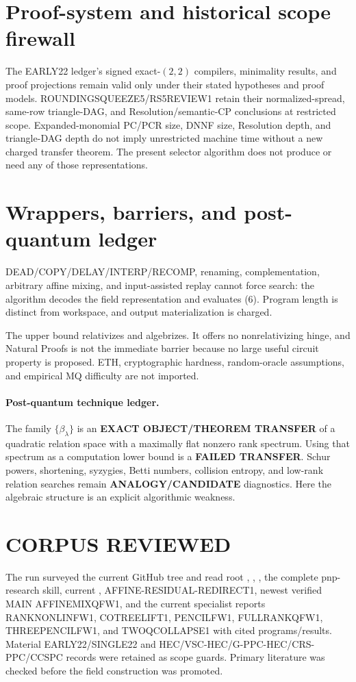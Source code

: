 \documentclass[11pt]{article}
\begin{document}
\section{Proof-system and historical scope firewall}
The EARLY22 ledger's signed exact-$(2,2)$ compilers, minimality results, and
proof projections remain valid only under their stated hypotheses and proof
models.  ROUNDINGSQUEEZE5/RS5REVIEW1 retain their normalized-spread,
same-row triangle-DAG, and Resolution/semantic-CP conclusions at restricted
scope.  Expanded-monomial PC/PCR size, DNNF size, Resolution depth, and
triangle-DAG depth do not imply unrestricted machine time without a new
charged transfer theorem.  The present selector algorithm does not produce
or need any of those representations.

\section{Wrappers, barriers, and post-quantum ledger}
DEAD/COPY/DELAY/INTERP/RECOMP, renaming, complementation, arbitrary affine
mixing, and input-assisted replay cannot force search: the algorithm decodes
the field representation and evaluates (6).  Program length is distinct from
workspace, and output materialization is charged.

The upper bound relativizes and algebrizes.  It offers no nonrelativizing
hinge, and Natural Proofs is not the immediate barrier because no large useful
circuit property is proposed.  ETH, cryptographic hardness, random-oracle
assumptions, and empirical MQ difficulty are not imported.

\paragraph{Post-quantum technique ledger.}
The family $\{\beta_\lambda\}$ is an \textbf{EXACT OBJECT/THEOREM TRANSFER}
of a quadratic relation space with a maximally flat nonzero rank spectrum.
Using that spectrum as a computation lower bound is a \textbf{FAILED
TRANSFER}.  Schur powers, shortening, syzygies, Betti numbers, collision
entropy, and low-rank relation searches remain \textbf{ANALOGY/CANDIDATE}
diagnostics.  Here the algebraic structure is an explicit algorithmic
weakness.

\section{CORPUS REVIEWED}
The run surveyed the current GitHub tree and read root ,
, , the complete pnp-research skill, current
, AFFINE-RESIDUAL-REDIRECT1, newest verified MAIN AFFINEMIXQFW1,
and the current specialist reports RANKNONLINFW1, COTREELIFT1, PENCILFW1,
FULLRANKQFW1, THREEPENCILFW1, and TWOQCOLLAPSE1 with cited programs/results.
Material EARLY22/SINGLE22 and HEC/VSC-HEC/G-PPC-HEC/CRS-PPC/CCSPC records
were retained as scope guards.  Primary literature was checked before the
field construction was promoted.
\end{document}
